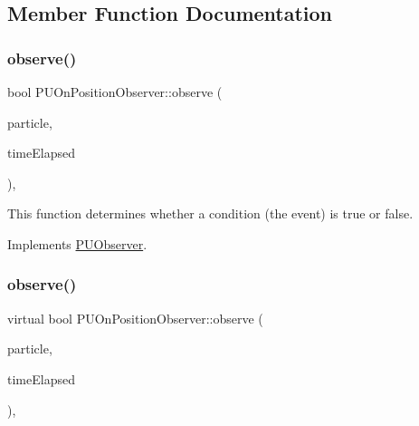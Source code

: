 \subsection{Member Function Documentation}
\mbox{\label{classPUOnPositionObserver_ab6d9011751d16face64818214a1acd21}} 
\subsubsection{\texorpdfstring{observe()}{observe()}\hspace{0.1cm}{\footnotesize\ttfamily [1/2]}}
{\footnotesize\ttfamily bool P\+U\+On\+Position\+Observer\+::observe (\begin{DoxyParamCaption}\item[{\hyperlink{structPUParticle3D}{P\+U\+Particle3D} $\ast$}]{particle,  }\item[{float}]{time\+Elapsed }\end{DoxyParamCaption})\hspace{0.3cm}{\ttfamily [override]}, {\ttfamily [virtual]}}

This function determines whether a condition (the event) is true or false. 

Implements \hyperlink{classPUObserver_a50f59cc3245e291b641463db5d3037f7}{P\+U\+Observer}.

\mbox{\label{classPUOnPositionObserver_a2c47b5b4b29896c659d4dea79d8360f1}} 
\subsubsection{\texorpdfstring{observe()}{observe()}\hspace{0.1cm}{\footnotesize\ttfamily [2/2]}}
{\footnotesize\ttfamily virtual bool P\+U\+On\+Position\+Observer\+::observe (\begin{DoxyParamCaption}\item[{\hyperlink{structPUParticle3D}{P\+U\+Particle3D} $\ast$}]{particle,  }\item[{float}]{time\+Elapsed }\end{DoxyParamCaption})\hspace{0.3cm}{\ttfamily [override]}, {\ttfamily [virtual]}}


